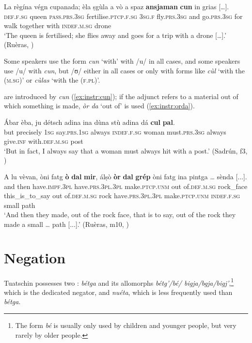 \ea
\label{ex:ansjamancun}
\gll   La règína végn cupanada; èla ṣgùla a vò a spaz \textbf{ansjaman} \textbf{cun} in grias […]. \\
    \textsc{def.f.sg} queen \textsc{pass.prs.3sg} fertilise.\textsc{ptcp.f.sg} \textsc{3sg.f} fly.\textsc{prs.3sg} and go.\textsc{prs.3sg} for walk together with \textsc{indef.m.sg} drone \\
\glt `The queen is fertilised; she flies away and goes for a trip with a drone […].' (Ruèras, )
\z

Some speakers use the form \textit{cun} `with' with /u/ in all cases, and some speakers use /u/ with \textit{cun}, but /ʊ/ either in all cases or only with  forms like \textit{cùl} `with the (\textsc{m.sg})' or \textit{cùlas} `with the \textsc{(f.pl})'.

 are introduced by \textit{cun} (\ref{ex:instr:cun}); if the adjunct refers to a material out of which something is made, \textit{òr da} `out of' is used (\ref{ex:instr:orda}).

\ea
\label{ex:instr:cun}
\gll Ábar èba, ju détsch adina ina dùna stù adina dá \textbf{cul} \textbf{pal}.\\
but precisely \textsc{1sg} say.\textsc{prs.1sg} always \textsc{indef.f.sg} woman must.\textsc{prs.3sg} always give.\textsc{inf} with.\textsc{def.m.sg} post\\
\glt `But in fact, I always say that a woman must always hit with a post.' (Sadrún, f3, )
\z

\ea
\label{ex:instr:orda}
\gll  A lu vèvan, òni fatg \textbf{ò} \textbf{dal} \textbf{mir}, álṣò \textbf{òr} \textbf{dal} \textbf{grép} òni fatg ina pintga …  sènda [...].\\
and then have.\textsc{impf.3pl} have.\textsc{prs.3pl.3pl} make.\textsc{ptcp.unm} out of.\textsc{def.m.sg} rock\_face this\_is\_to\_say out of.\textsc{def.m.sg} rock have.\textsc{prs.3pl.3pl} make.\textsc{ptcp.unm} \textsc{indef.f.sg} small {} path\\
\glt `And then they made, out of the rock face, that is to say, out of the rock they made a small … path [...].' (Ruèras, m10, )
\z 


\section{Negation}\label{sec:4.4}
Tuatschin possesses two : \textit{bétga} and its allomorphs \textit{bétg'/bé/ bigja/bgja/bigj'},\footnote{The form \textit{bé} is usually only used by children and younger people, but very rarely by older people.} which is the dedicated negator, and \textit{nuéta}, which is less frequently used than \textit{bétga}.


